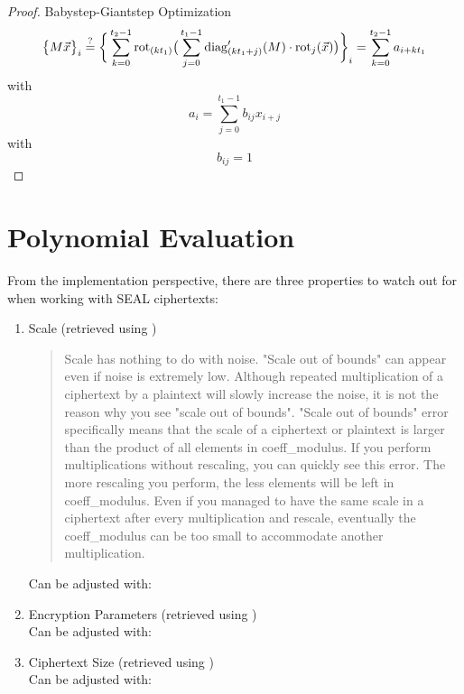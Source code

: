 \begin{proof}{Babystep-Giantstep Optimization}
  \begin{align*}
    \big\{M \vec{x}\big\}_i \overset{?}{=} \bigg\{\sum_{k=0}^{t_2-1} \mathrm{rot}_{(kt_1)} \big(
    \sum_{j=0}^{t_1-1} \mathrm{diag}'_{(kt_1+j)}(M) \cdot \mathrm{rot}_j(\vec{x})
    \big)\bigg\}_i = \sum_{k=0}^{t_2-1} a_{i + kt_1}
  \end{align*}
  with
  $$a_i = \sum_{j=0}^{t_1-1} b_{ij} x_{i+j}$$
  with
  $$b_{ij} = 1$$
\end{proof}

\section{Polynomial Evaluation}
From the implementation perspective, there are three properties to watch out for when
working with SEAL ciphertexts:

\begin{enumerate}
  \item Scale (retrieved using )
        \begin{quote}
          Scale has nothing to do with noise. "Scale out of bounds" can appear even if noise is extremely low. Although repeated multiplication of a ciphertext by a plaintext will slowly increase the noise, it is not the reason why you see "scale out of bounds".
          "Scale out of bounds" error specifically means that the scale of a ciphertext or plaintext is larger than the product of all elements in coeff\_modulus. If you perform multiplications without rescaling, you can quickly see this error. The more rescaling you perform, the less elements will be left in coeff\_modulus. Even if you managed to have the same scale in a ciphertext after every multiplication and rescale, eventually the coeff\_modulus can be too small to accommodate another multiplication.
        \end{quote}

        Can be adjusted with: 
  \item Encryption Parameters (retrieved using ) \\
        Can be adjusted with: 
  \item Ciphertext Size (retrieved using ) \\
        Can be adjusted with: 
\end{enumerate}

